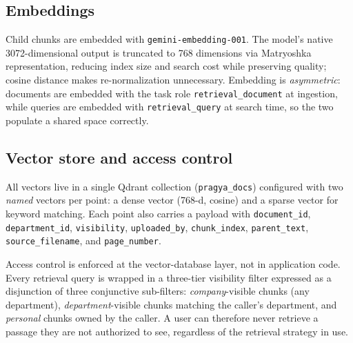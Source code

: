 \documentclass[conference]{IEEEtran}
\begin{document}
\subsection{Embeddings}
Child chunks are embedded with \texttt{gemini-embedding-001}. The model's native
3072-dimensional output is truncated to 768 dimensions via Matryoshka
representation, reducing index size and search cost while preserving quality;
cosine distance makes re-normalization unnecessary. Embedding is
\emph{asymmetric}: documents are embedded with the task role
\texttt{retrieval\_document} at ingestion, while queries are embedded with
\texttt{retrieval\_query} at search time, so the two populate a shared space
correctly.

\subsection{Vector store and access control}
All vectors live in a single Qdrant collection (\texttt{pragya\_docs}) configured
with two \emph{named} vectors per point: a dense vector (768-d, cosine) and a
sparse vector for keyword matching. Each point also carries a payload with
\texttt{document\_id}, \texttt{department\_id}, \texttt{visibility},
\texttt{uploaded\_by}, \texttt{chunk\_index}, \texttt{parent\_text},
\texttt{source\_filename}, and \texttt{page\_number}.

Access control is enforced at the vector-database layer, not in application code.
Every retrieval query is wrapped in a three-tier visibility filter expressed as a
disjunction of three conjunctive sub-filters: \emph{company}-visible chunks
(any department), \emph{department}-visible chunks matching the caller's
department, and \emph{personal} chunks owned by the caller. A user can therefore
never retrieve a passage they are not authorized to see, regardless of the
retrieval strategy in use.
\end{document}
